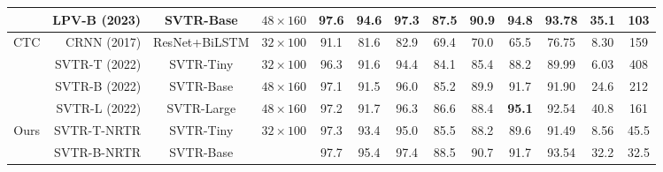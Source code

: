\documentclass[10pt,journal,compsoc]{IEEEtran}
\begin{document}
\begin{table*}[t]
{\begin{tabular}{c|r|c|c|ccc|ccc|c|cc}
                        & LPV-B \cite{ijcai2023LPV} (2023) & SVTR-Base       & $48\times160$           & 97.6          & 94.6          & 97.3          & 87.5          & 90.9          & 94.8          & 93.78                                                                       &   35.1     & 103 \\
\hline
\multirow{4}{*}{CTC}    & CRNN \cite{shi2017crnn} (2017)& ResNet+BiLSTM     & $32\times100$           & 91.1          & 81.6          & 82.9          & 69.4          & 70.0          & 65.5          & 76.75                                                                       & 8.30                                                                     & 159                                                                  \\
                        & SVTR-T \cite{duijcai2022svtr} (2022)& SVTR-Tiny    & $32\times100$           & 96.3          & 91.6          & 94.4          & 84.1          & 85.4          & 88.2          & 89.99                                                                       & 6.03                                                                    & 408                                                               \\
                        & SVTR-B \cite{duijcai2022svtr} (2022) & SVTR-Base     & $48\times160$        & 97.1          & 91.5          & 96.0          & 85.2          & 89.9          & 91.7          & 91.90                                                                       & 24.6                                                                    & 212                                                               \\
                        & SVTR-L \cite{duijcai2022svtr} (2022)& SVTR-Large     & $48\times160$         & 97.2          & 91.7          & 96.3          & 86.6          & 88.4          & \textbf{95.1}          & 92.54                                                                       & 40.8                                                                    & 161                                                                \\
\hline
\multirow{5}{*}{Ours}    & SVTR-T-NRTR & SVTR-Tiny & \multirow{4}{*}{$32\times100$}    & 97.3          & 93.4          & 95.0          & 85.5          & 88.2          & 89.6          & 91.49                                                                       & 8.56                                                                     & 45.5                                                              \\
& SVTR-B-NRTR  & SVTR-Base  &      & 97.7 & 95.4 & 97.4 & 88.5 & 90.7 & 91.7 & 93.54                                                              & 32.2                                                                    & 32.5                                                               \\
                

\end{tabular}}
\end{table*}
\end{document}
